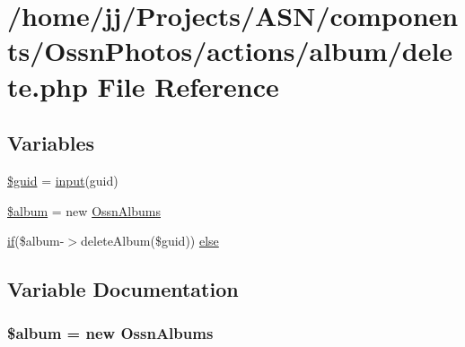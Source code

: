 \hypertarget{components_2_ossn_photos_2actions_2album_2delete_8php}{}\section{/home/jj/\+Projects/\+A\+S\+N/components/\+Ossn\+Photos/actions/album/delete.php File Reference}
\label{components_2_ossn_photos_2actions_2album_2delete_8php}
\subsection*{Variables}
\begin{DoxyCompactItemize}
\item 
\hyperlink{components_2_ossn_photos_2actions_2album_2delete_8php_af99126304cbcb2e1483892c40bb3aae4}{\$guid} = \hyperlink{ossn_8lib_8input_8php_a64ebee98b041c4f75f71ed3cd73cc8ed}{input}(\textquotesingle{}guid\textquotesingle{})
\item 
\hyperlink{components_2_ossn_photos_2actions_2album_2delete_8php_ac40a9764673b6d86593dc674331c5116}{\$album} = new \hyperlink{class_ossn_albums}{Ossn\+Albums}
\item 
\hyperlink{jquery_8tokeninput_8js_ad8dd46a3cbc004569e34401e9e71771a}{if}(\$album-\/$>$delete\+Album(\$guid)) \hyperlink{components_2_ossn_photos_2actions_2album_2delete_8php_a242e3ffa377520d9729f18c93baa436d}{else}
\end{DoxyCompactItemize}


\subsection{Variable Documentation}
\subsubsection[{\texorpdfstring{\$album}{$album}}]{\setlength{\rightskip}{0pt plus 5cm}\$album = new {\bf Ossn\+Albums}}\hypertarget{components_2_ossn_photos_2actions_2album_2delete_8php_ac40a9764673b6d86593dc674331c5116}{}\label{components_2_ossn_photos_2actions_2album_2delete_8php_ac40a9764673b6d86593dc674331c5116}


